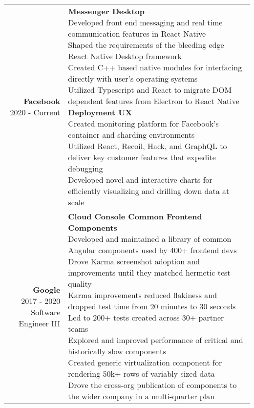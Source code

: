 \documentclass{article}
\makeatletter
\newcommand*\lineBr[2][c]{\begin{tabular}[#1]{@{}r@{}}#2\end{tabular}}
\newcommand*\lineBl[2][c]{\begin{tabular}[#1]{@{}l@{}}#2\end{tabular}}
\makeatother
\begin{document}
\begin{tabularx}{\textwidth}{ r | X }
  \vspace{4mm}
  \lineBr{ {\large {\bf Facebook }\\[2mm]2020 - Current}} &
  \lineBl{
    {\bf Messenger Desktop} \\[2mm]
    Developed front end messaging and real time communication features in React Native \\[2mm]
    Shaped the requirements of the bleeding edge React Native Desktop framework \\[2mm]
    Created C++ based native modules for interfacing directly with user's operating systems \\[2mm]
    Utilized Typescript and React to migrate DOM dependent features from Electron to React Native \\[2mm]
    {\bf Deployment UX} \\[2mm]
    Created monitoring platform for Facebook's container and sharding environments \\[2mm]
    Utilized React, Recoil, Hack, and GraphQL to deliver key customer features that expedite debugging \\[2mm]
    Developed novel and interactive charts for efficiently visualizing and drilling down data at scale
  } \\
  \vspace{4mm}
  \lineBr{ {\large {\bf Google }\\[2mm]2017 - 2020\\[2mm]Software Engineer III}} &
  \lineBl{
    {\bf Cloud Console Common Frontend Components} \\[2mm]
    Developed and maintained a library of common Angular components used by 400+ frontend devs \\[2mm]
    Drove Karma screenshot adoption and improvements until they matched hermetic test quality \\[2mm]
    Karma improvements reduced flakiness and dropped test time from 20 minutes to 30 seconds \\[2mm]
    Led to 200+ tests created across 30+ partner teams \\[2mm]
    Explored and improved performance of critical and historically slow components \\[2mm]
    Created generic virtualization component for rendering 50k+ rows of variably sized data \\[2mm]
    Drove the cross-org publication of components to the wider company in a multi-quarter plan \\[2mm]
}
\end{tabularx}
\end{document}
